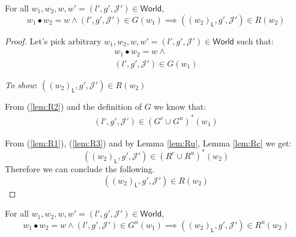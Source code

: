 \lem \label{lem:R} For all $w_1, w_2, w, w' = (l', g', \mathcal{J}') \in \mathsf{World}$,
\[
	w_1 \bullet w_2 = w \land (l', g', \mathcal{J}') \in G(w_1) \implies ((w_2)_\mathsf{L}, g', \mathcal{J}') \in R(w_2)
\]

{\parindent0pt
\begin{proof}
Let's pick arbitrary $w_1, w_2, w, w' = (l', g', \mathcal{J}') \in \mathsf{World}$ such that:
\begin{gather}
	\label{lem:R1} w_1 \bullet w_2 = w \land
	\\
	\label{lem:R2} (l', g', \mathcal{J}') \in G(w_1)
\end{gather}

\textit{To show}: $((w_2)_\mathsf{L}, g', \mathcal{J}') \in R(w_2)$

From (\ref{lem:R2}) and the definition of $G$ we know that:
\begin{gather}
	\label{lem:R3} (l', g', \mathcal{J}') \in (G^c \cup G^u)^*(w_1)
\end{gather}

From (\ref{lem:R1}), (\ref{lem:R3}) and by Lemma \ref{lem:Ru}, Lemma \ref{lem:Rc} we get:
\[
	((w_2)_\mathsf{L}, g', \mathcal{J}') \in (R^c \cup R^u)^*(w_2)
\]
Therefore we can conclude the following.
\[
	((w_2)_\mathsf{L}, g', \mathcal{J}') \in R(w_2)
\]
\end{proof}
}

\lem \label{lem:Ru} For all $w_1, w_2, w, w' = (l', g', \mathcal{J}') \in \mathsf{World}$,
\[
	w_1 \bullet w_2 = w \land (l', g', \mathcal{J}') \in G^u(w_1) \implies ((w_2)_\mathsf{L}, g', \mathcal{J}') \in R^u(w_2)
\]

